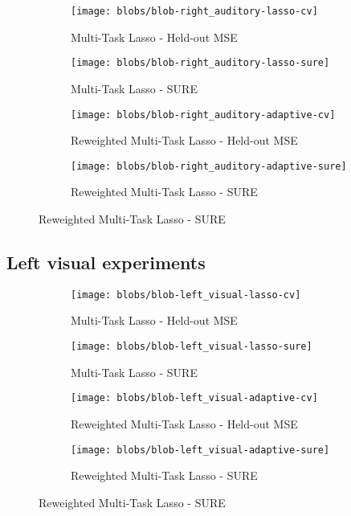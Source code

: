 \begin{figure}
    \centering
    \begin{subfigure}{6cm}
        \centering \texttt{[image: blobs/blob-right\_auditory-lasso-cv]}
        \caption{Multi-Task Lasso - Held-out MSE}
    \end{subfigure}
    \begin{subfigure}{6cm}
        \centering \texttt{[image: blobs/blob-right\_auditory-lasso-sure]}
        \caption{Multi-Task Lasso - SURE}
    \end{subfigure}

    \begin{subfigure}{6cm}
        \centering \texttt{[image: blobs/blob-right\_auditory-adaptive-cv]}
        \caption{Reweighted Multi-Task Lasso - Held-out MSE}
    \end{subfigure}
    \begin{subfigure}{6cm}
        \centering \texttt{[image: blobs/blob-right\_auditory-adaptive-sure]}
        \caption{Reweighted Multi-Task Lasso - SURE}
    \end{subfigure}
\end{figure}


\subsection{Left visual experiments}

\begin{figure}
    \centering
    \begin{subfigure}{6cm}
        \centering \texttt{[image: blobs/blob-left\_visual-lasso-cv]}
        \caption{Multi-Task Lasso - Held-out MSE}
    \end{subfigure}
    \begin{subfigure}{6cm}
        \centering \texttt{[image: blobs/blob-left\_visual-lasso-sure]}
        \caption{Multi-Task Lasso - SURE}
    \end{subfigure}

    \begin{subfigure}{6cm}
        \centering \texttt{[image: blobs/blob-left\_visual-adaptive-cv]}
        \caption{Reweighted Multi-Task Lasso - Held-out MSE}
    \end{subfigure}
    \begin{subfigure}{6cm}
        \centering \texttt{[image: blobs/blob-left\_visual-adaptive-sure]}
        \caption{Reweighted Multi-Task Lasso - SURE}
    \end{subfigure}
\end{figure}


